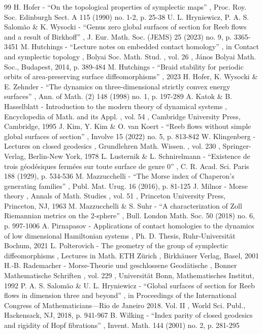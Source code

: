 \documentclass[11pt]{article}
\theoremstyle{plain}
\theoremstyle{definition}
\begin{document}
\begin{thebibliography}{99}
 H. Hofer - “On the topological properties of symplectic maps” , Proc. Roy. Soc. Edinburgh Sect. A 115 (1990) no. 1-2, p. 25-38
 U. L. Hryniewicz, P. A. S. Salomão \& K. Wysocki - “Genus zero global surfaces of section for Reeb flows and a result of Birkhoff” , J. Eur. Math. Soc. (JEMS) 25 (2023) no. 9, p. 3365-3451
 M. Hutchings - “Lecture notes on embedded contact homology” , in Contact and symplectic topology , Bolyai Soc. Math. Stud. , vol. 26 , János Bolyai Math. Soc., Budapest, 2014, p. 389-484
 M. Hutchings - “Braid stability for periodic orbits of area-preserving surface diffeomorphisms” , 2023
 H. Hofer, K. Wysocki \& E. Zehnder - “The dynamics on three-dimensional strictly convex energy surfaces” , Ann. of Math. (2) 148 (1998) no. 1, p. 197-289
 A. Katok \& B. Hasselblatt - Introduction to the modern theory of dynamical systems , Encyclopedia of Math. and its Appl. , vol. 54 , Cambridge University Press, Cambridge, 1995
 J. Kim, Y. Kim \& O. van Koert - “Reeb flows without simple global surfaces of section” , Involve 15 (2022) no. 5, p. 813-842
 W. Klingenberg - Lectures on closed geodesics , Grundlehren Math. Wissen. , vol. 230 , Springer-Verlag, Berlin-New York, 1978
 L. Lusternik \& L. Schnirelmann - “Existence de trois géodésiques fermées sur toute surface de genre 0” , C. R. Acad. Sci. Paris 188 (1929), p. 534-536
 M. Mazzucchelli - “The Morse index of Chaperon’s generating families” , Publ. Mat. Urug. 16 (2016), p. 81-125
 J. Milnor - Morse theory , Annals of Math. Studies , vol. 51 , Princeton University Press, Princeton, NJ, 1963
 M. Mazzucchelli \& S. Suhr - “A characterization of Zoll Riemannian metrics on the 2-sphere” , Bull. London Math. Soc. 50 (2018) no. 6, p. 997-1006
 A. Pirnapasov - Applications of contact homologies to the dynamics of low dimensional Hamiltonian systems , Ph. D. Thesis, Ruhr-Universität Bochum, 2021
 L. Polterovich - The geometry of the group of symplectic diffeomorphisms , Lectures in Math. ETH Zürich , Birkhäuser Verlag, Basel, 2001
 H.-B. Rademacher - Morse-Theorie und geschlossene Geodätische , Bonner Mathematische Schriften , vol. 229 , Universität Bonn, Mathematisches Institut, 1992
 P. A. S. Salomão \& U. L. Hryniewicz - “Global surfaces of section for Reeb flows in dimension three and beyond” , in Proceedings of the International Congress of Mathematicians—Rio de Janeiro 2018. Vol. II , World Sci. Publ., Hackensack, NJ, 2018, p. 941-967
 B. Wilking - “Index parity of closed geodesics and rigidity of Hopf fibrations” , Invent. Math. 144 (2001) no. 2, p. 281-295
\end{thebibliography}
\end{document}
